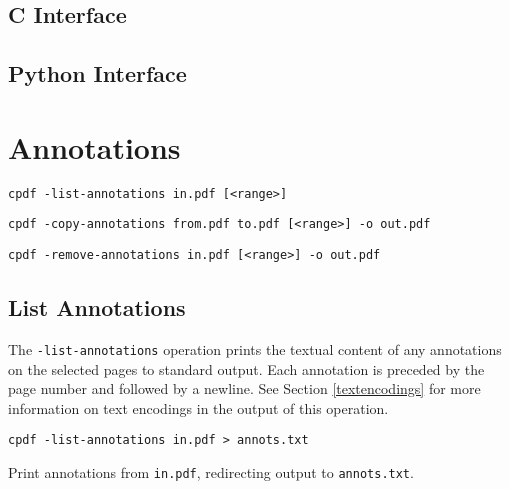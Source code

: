 \documentclass{book}
\begin{document}
\begin{cpdflib}
\clearpage
\section*{C Interface}
\begin{small}\tt

\end{small}
\end{cpdflib}

\begin{pycpdflib}
\clearpage
\section*{Python Interface}
\begin{small}\tt

\end{small}
\end{pycpdflib}

\chapter{Annotations}\label{chap:10}
  \begin{framed}
  \small\noindent\verb!cpdf -list-annotations in.pdf [<range>]!

  \vspace{1.5mm}
  \small\noindent\verb!cpdf -copy-annotations from.pdf to.pdf [<range>] -o out.pdf!

  \vspace{1.5mm}
  \small\noindent\verb!cpdf -remove-annotations in.pdf [<range>] -o out.pdf!
  \end{framed}

  \section{List Annotations}
  The \texttt{-list-annotations} operation prints the textual content of any
annotations on the selected pages to standard output. Each annotation is preceded by the page number and followed by a newline. See Section \ref{textencodings} for more information on text encodings in the output of this operation.
  \begin{framed}
    \small\verb!cpdf -list-annotations in.pdf > annots.txt!
    
    \vspace{2.5mm}
    \noindent Print annotations from \texttt{in.pdf}, redirecting output to \texttt{annots.txt}.
  \end{framed}
\end{document}
